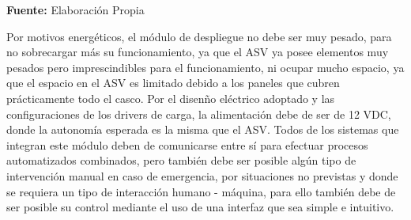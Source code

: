 \begin{table}[H]
\protect\caption[Datos T\'ecnicos m\'odulo despliegue]{Datos T\'ecnicos m\'odulo despliegue. \label{tab:carac_general}}
    \centering
    \vspace{5mm}
    \newline
    \hfill \textbf{Fuente:} Elaboraci\'on Propia
\end{table}
Por motivos energ\'eticos, el m\'odulo de despliegue no debe ser muy pesado, para no sobrecargar m\'as su funcionamiento, ya que el ASV ya posee elementos muy pesados pero imprescindibles para el funcionamiento, ni ocupar mucho espacio, ya que el espacio en el ASV es limitado debido a los paneles que cubren pr\'acticamente todo el casco. 
Por el disen\~no el\'ectrico adoptado y las configuraciones de los drivers de carga, la alimentación debe de ser de 12 VDC, donde la autonom\'ia esperada es la misma que el ASV. Todos de los sistemas que integran este m\'odulo deben de comunicarse entre s\'i para efectuar procesos automatizados combinados, pero tambi\'en debe ser posible alg\'un tipo de intervenci\'on manual en caso de emergencia, por situaciones no previstas y donde se requiera un tipo de interacci\'on humano - máquina, para ello también debe de ser posible su control mediante el uso de una interfaz que sea simple e intuitivo.

